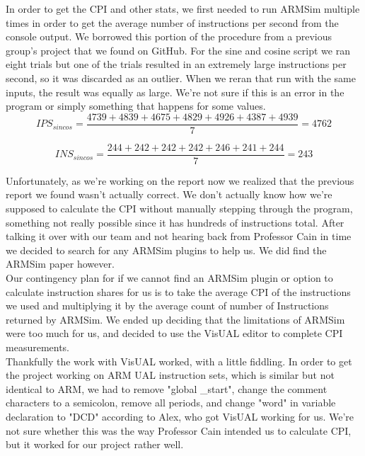 \documentclass[11pt]{article}
\begin{document}
In order to get the CPI and other stats, we first needed to run ARMSim multiple times in order to get
the average number of instructions per second from the console output. We borrowed this portion of the
procedure from a previous group's project that we found on GitHub.\cite{oldreport} For the sine and
cosine script we ran eight trials but one of the trials resulted in an extremely large instructions
per second, so it was discarded as an outlier. When we reran that run with the same inputs, the result
was equally as large. We're not sure if this is an error in the program or simply something that happens
for some values.\\

\begin{equation}
    IPS_{sincos} = \frac{4739 + 4839 + 4675 + 4829 + 4926 + 4387 + 4939}{7} = 4762
\end{equation}

\begin{equation}
    INS_{sincos} = \frac{244 + 242 + 242 + 242 + 246 + 241 + 244}{7} = 243
\end{equation}

Unfortunately, as we're working on the report now we realized that the previous report we found wasn't
actually correct.\cite{oldreport} We don't actually know how we're supposed to calculate the CPI without
manually stepping through the program, something not really possible since it has hundreds of instructions
total. After talking it over with our team and not hearing back from Professor Cain in time we decided to
search for any ARMSim plugins to help us. We did find the ARMSim paper however.\cite{armsim}\\

Our contingency plan for if we cannot find an ARMSim plugin or option to calculate instruction shares for
us is to take the average CPI of the instructions we used and multiplying it by the average count of number
of Instructions returned by ARMSim. We ended up deciding that the limitations of ARMSim were too much for
us, and decided to use the VisUAL editor to complete CPI measurements.\cite{visUAL}\\

Thankfully the work with VisUAL worked, with a little fiddling. In order to get the project working on ARM UAL
instruction sets, which is similar but not identical to ARM, we had to remove "global \_start", change the
comment characters to a semicolon, remove all periods, and change "word" in variable declaration to "DCD"
according to Alex, who got VisUAL working for us. We're not sure whether this was the way Professor Cain
intended us to calculate CPI, but it worked for our project rather well.\\
\end{document}
